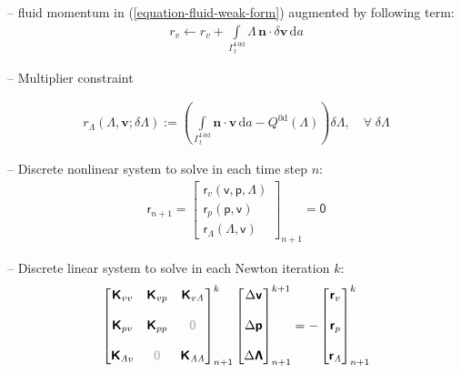 \documentclass[a4paper,12pt]{report}
\newcommand{\fF}{\text{f}}
\newcommand{\bs}[1]{\boldsymbol{#1}}
\newcommand{\Gm}{\mathit{\Gamma}}
\newcommand{\zerom}{\textcolor{lightgray}{\bs{\mathsf{0}}}}
\newcommand{\ROP}{\bs{\mathsf{r}}}
\newcommand{\LMZ}{\bs{\mathsf{\Lambda}}}
\newcommand{\lmzi}{\mathit{\Lambda}} %
\begin{document}
-- fluid momentum in (\ref{equation-fluid-weak-form}) augmented by following term:
\begin{equation}
\begin{aligned}
r_v \leftarrow r_v + \int\limits_{\Gm_t^{\fF\text{-}\mathrm{0d}}}\!\mathit{\Lambda}\,\bs{n}\cdot\delta\bs{v}\,\mathrm{d}a
\end{aligned}
\end{equation}

-- Multiplier constraint

\begin{equation}
\begin{aligned}
r_{\mathit{\Lambda}}(\mathit{\Lambda},\bs{v};\delta\mathit{\Lambda}):= \left(\int\limits_{\Gm_t^{\mathrm{\fF\text{-}0d}}}\! \bs{n}\cdot\bs{v}\,\mathrm{d}a - Q^{\mathrm{0d}}(\mathit{\Lambda})\right) \delta\mathit{\Lambda}, \quad \forall \; \delta\mathit{\Lambda}
\end{aligned}
\end{equation}

-- Discrete nonlinear system to solve in each time step $n$:
\begin{equation}
\label{equation-nonlin-sys-fluid-0d}
\begin{aligned}
\ROP_{n+1} = \begin{bmatrix} \ROP_{v}(\bs{\mathsf{v}},\bs{\mathsf{p}},\LMZ) \\ \ROP_{p}(\bs{\mathsf{p}},\bs{\mathsf{v}}) \\ \ROP_{\mathit{\Lambda}}(\LMZ,\bs{\mathsf{v}}) \end{bmatrix}_{n+1} = \bs{\mathsf{0}}
\end{aligned}
\end{equation}

-- Discrete linear system to solve in each Newton iteration $k$:
\begin{equation}
\label{equation-lin-sys-fluid-0d}
\begin{aligned}
\begin{bmatrix} \bs{\mathsf{K}}_{vv} & \bs{\mathsf{K}}_{vp} & \bs{\mathsf{K}}_{v\lmzi} \\ \\ \bs{\mathsf{K}}_{pv} & \bs{\mathsf{K}}_{pp} & \zerom \\ \\  \bs{\mathsf{K}}_{\lmzi v} & \zerom & \bs{\mathsf{K}}_{\lmzi\lmzi}\end{bmatrix}_{n+1}^{k}\begin{bmatrix} \Delta\bs{\mathsf{v}} \\ \\ \Delta\bs{\mathsf{p}} \\ \\ \Delta\LMZ \end{bmatrix}_{n+1}^{k+1}=-\begin{bmatrix} \ROP_{v} \\ \\ \ROP_{p} \\ \\ \ROP_{\lmzi}\end{bmatrix}_{n+1}^{k}
\end{aligned}
\end{equation}
\end{document}
